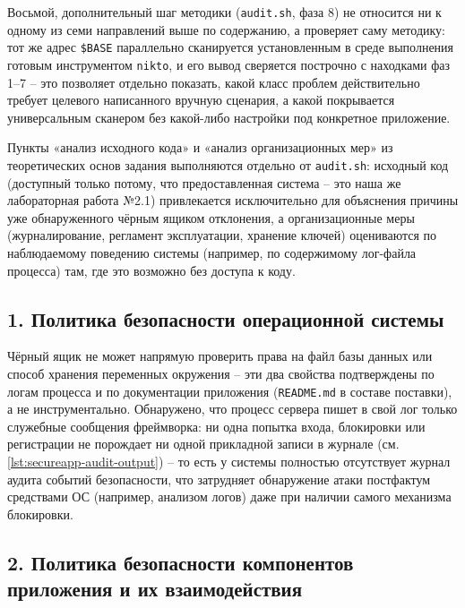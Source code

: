 Восьмой, дополнительный шаг методики (\texttt{audit.sh}, фаза 8) не
относится ни к одному из семи направлений выше по содержанию, а
проверяет саму методику: тот же адрес \texttt{\$BASE} параллельно
сканируется установленным в среде выполнения готовым инструментом
\texttt{nikto}, и его вывод сверяется построчно с находками фаз 1--7 --
это позволяет отдельно показать, какой класс проблем действительно
требует целевого написанного вручную сценария, а какой покрывается
универсальным сканером без какой-либо настройки под конкретное
приложение.

Пункты «анализ исходного кода» и «анализ организационных мер»
из теоретических основ задания выполняются отдельно от \texttt{audit.sh}:
исходный код (доступный только потому, что предоставленная система -- это
наша же лабораторная работа №2.1) привлекается исключительно для
объяснения причины уже обнаруженного чёрным ящиком отклонения, а
организационные меры (журналирование, регламент эксплуатации, хранение
ключей) оцениваются по наблюдаемому поведению системы (например,
по содержимому лог-файла процесса) там, где это возможно без доступа к
коду.


\subsection*{1. Политика безопасности операционной системы}

Чёрный ящик не может напрямую проверить права на файл базы данных или
способ хранения переменных окружения -- эти два свойства подтверждены по
логам процесса и по документации приложения (\texttt{README.md} в составе
поставки), а не инструментально. Обнаружено, что процесс сервера пишет в
свой лог только служебные сообщения фреймворка: ни одна попытка входа,
блокировки или регистрации не порождает ни одной прикладной записи в
журнале (см. \autoref{lst:secureapp-audit-output}) -- то есть у системы
полностью отсутствует журнал аудита событий безопасности, что
затрудняет обнаружение атаки постфактум средствами ОС (например,
анализом логов) даже при наличии самого механизма блокировки.

\subsection*{2. Политика безопасности компонентов приложения и их взаимодействия}


